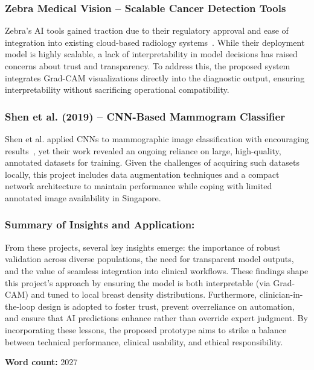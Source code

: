 \documentclass[12pt]{article}
\begin{document}
\subsubsection{Zebra Medical Vision – Scalable Cancer Detection Tools~\cite{12}} 
    Zebra’s AI tools gained traction due to their regulatory approval and ease of integration into existing cloud-based radiology systems~\cite{12}. While their deployment model is highly scalable, a lack of interpretability in model decisions has raised concerns about trust and transparency. To address this, the proposed system integrates Grad-CAM visualizations directly into the diagnostic output, ensuring interpretability without sacrificing operational compatibility.

\subsubsection{Shen et al. (2019) – CNN-Based Mammogram Classifier~\cite{7}} 
    Shen et al. applied CNNs to mammographic image classification with encouraging results~\cite{7}, yet their work revealed an ongoing reliance on large, high-quality, annotated datasets for training. Given the challenges of acquiring such datasets locally, this project includes data augmentation techniques and a compact network architecture to maintain performance while coping with limited annotated image availability in Singapore.


\subsubsection{Summary of Insights and Application:} 
From these projects, several key insights emerge: the importance of robust validation across diverse populations, the need for transparent model outputs, and the value of seamless integration into clinical workflows. These findings shape this project’s approach by ensuring the model is both interpretable (via Grad-CAM) and tuned to local breast density distributions. Furthermore, clinician-in-the-loop design is adopted to foster trust, prevent overreliance on automation, and ensure that AI predictions enhance rather than override expert judgment. By incorporating these lessons, the proposed prototype aims to strike a balance between technical performance, clinical usability, and ethical responsibility.

\vspace{2em}
\noindent\textbf{Word count:} 2027

\newpage
\end{document}
